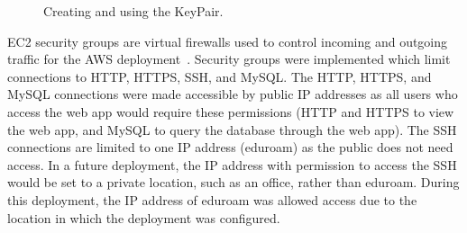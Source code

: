 \begin{figure}[!htbp]
\begin{minipage}{.5\textwidth}
        \label{fig:log-in-keypair-pem}
    \end{minipage}
    \caption{Creating and using the KeyPair.}
    \label{fig:create-use-keypair}
\end{figure}

\clearpage
EC2 security groups are virtual firewalls used to control incoming and outgoing traffic for the AWS
deployment~\parencite{amazon2022amazon2}.
Security groups were implemented which limit connections to HTTP, HTTPS, SSH, and MySQL\@.
The HTTP, HTTPS, and MySQL connections were made accessible by public IP addresses as all users who access the web app
would require these permissions (HTTP and HTTPS to view the web app, and MySQL to query the database through the web
app).
The SSH connections are limited to one IP address (eduroam) as the public does not need access.
In a future deployment, the IP address with permission to access the SSH would be set to a private location, such as an
office, rather than eduroam.
During this deployment, the IP address of eduroam was allowed access due to the location in which the deployment was
configured.

